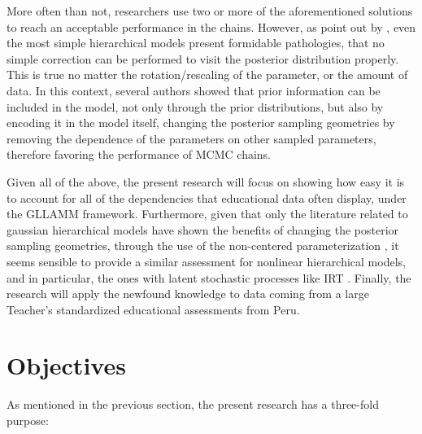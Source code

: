 More often than not, researchers use two or more of the aforementioned solutions to reach an acceptable performance in the chains. However, as point out by \citet{Betancourt_et_al_2013}, even the most simple hierarchical models present formidable pathologies, that no simple correction can be performed to visit the posterior distribution properly. This is true no matter the rotation/rescaling of the parameter, or the amount of data. In this context, several authors \cite{Gelfand_et_al_1995, Gelfand_et_al_1996, Papaspiliopoulos_et_al_2003, Papaspiliopoulos_et_al_2007, Betancourt_et_al_2013} showed that prior information can be included in the model, not only through the prior distributions, but also by encoding it in the model itself, changing the posterior sampling geometries by removing the dependence of the parameters on other sampled parameters, therefore favoring the performance of MCMC chains.

Given all of the above, the present research will focus on showing how easy it is to account for all of the dependencies that educational data often display, under the GLLAMM framework. Furthermore,  given that only the literature related to gaussian hierarchical models have shown the benefits of changing the posterior sampling geometries, through the use of the non-centered parameterization \cite{Gelfand_et_al_1995, Gelfand_et_al_1996, Papaspiliopoulos_et_al_2003, Papaspiliopoulos_et_al_2007, Betancourt_et_al_2013}, it seems sensible to provide a similar assessment for nonlinear hierarchical models, and in particular, the ones with latent stochastic processes like IRT \cite{Papaspiliopoulos_et_al_2007}. Finally, the research will apply the newfound knowledge to data coming from a large Teacher's standardized educational assessments from Peru.


\section{Objectives}

As mentioned in the previous section, the present research has a three-fold purpose:

